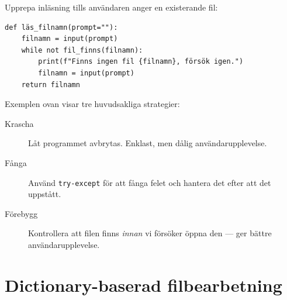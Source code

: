 \begin{frame}[fragile]
  \begin{example}
    Upprepa inläsning tills användaren anger en existerande fil:
    \begin{verbatim}
def läs_filnamn(prompt=""):
    filnamn = input(prompt)
    while not fil_finns(filnamn):
        print(f"Finns ingen fil {filnamn}, försök igen.")
        filnamn = input(prompt)
    return filnamn
    \end{verbatim}
  \end{example}
\end{frame}


\begin{frame}
  \begin{remark}
    Exemplen ovan visar tre huvudsakliga strategier:
    \begin{description}
      \item[Krascha] Låt programmet avbrytas. Enklast, men dålig användarupplevelse.
      \item[Fånga] Använd \texttt{try-except} för att fånga felet och
        hantera det efter att det uppstått.
      \item[Förebygg] Kontrollera att filen finns \emph{innan} vi försöker öppna
        den --- ger bättre användarupplevelse.
    \end{description}
  \end{remark}
\end{frame}



\section{Dictionary-baserad filbearbetning}

